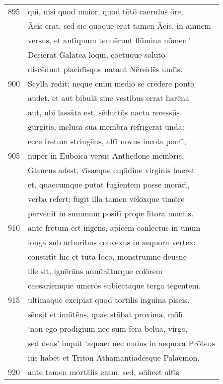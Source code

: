 \documentclass[paper=6in:9in,pagesize=pdftex,
               headinclude=on,footinclude=on,12pt]{scrbook}
\begin{document}
\begin{longtable}[p]{ r l }
895 & qu\={\i}, nisi quod maior, quod t\=ot\=o caerulus \=ore,\\ 
 & \=Acis erat, sed s\={\i}c quoque erat tamen \=Acis, in amnem\\ 
 & versus, et ant\={\i}quum tenu\=erunt fl\=umina n\=omen.'\\ 
 & \indent D\=esierat Galat\=ea loqu\={\i}, coet\=uque sol\=ut\=o\\ 
 & disc\=edunt placid\={\i}sque natant N\=ereid\=es und\={\i}s.\\ 
900 & Scylla redit; neque enim medi\=o s\=e cr\=edere pont\=o\\ 
 & audet, et aut bibul\=a sine vestibus errat har\=ena\\ 
 & aut, ubi lass\=ata est, s\=educt\=os nacta recess\=us\\ 
 & gurgitis, incl\=us\=a sua membra refr\={\i}gerat unda:\\ 
 & ecce fretum string\=ens, alt\={\i} novus incola pont\={\i},\\ 
905 & n\=uper in Euboic\=a vers\={\i}s Anth\=edone membr\={\i}s,\\ 
 & Glaucus adest, v\={\i}saeque cup\={\i}dine virginis haeret\\ 
 & et, quaecumque putat fugientem posse mor\=ar\={\i},\\ 
 & verba refert; fugit illa tamen v\=el\=oxque tim\=ore\\ 
 & pervenit in summum posit\={\i} prope l\={\i}tora montis.\\ 
910 & ante fretum est ing\=ens, apicem conl\=ectus in \=unum\\ 
 & longa sub arboribus convexus in aequora vertex:\\ 
 & c\=onstitit h\={\i}c et t\=uta loc\=o, m\=onstrumne deusne\\ 
 & ille sit, ign\=or\=ans adm\={\i}r\=aturque col\=orem\\ 
 & caesariemque umer\=os subiectaque terga tegentem,\\ 
915 & ultimaque excipiat quod tortilis inguina piscis.\\ 
 & s\=ensit et inn\={\i}t\=ens, quae st\=abat proxima, m\=ol\={\i}\\ 
 & `n\=on ego pr\=odigium nec sum fera b\=elua, virg\=o,\\ 
 & sed deus' inquit `aquae: nec maius in aequora Pr\=oteus\\ 
 & i\=us habet et Tr\={\i}t\=on Athamantiad\=esque Palaem\=on.\\ 
920 & ante tamen mort\=alis eram, sed, sc\={\i}licet alt\={\i}s\\ 

\end{longtable}
\end{document}
